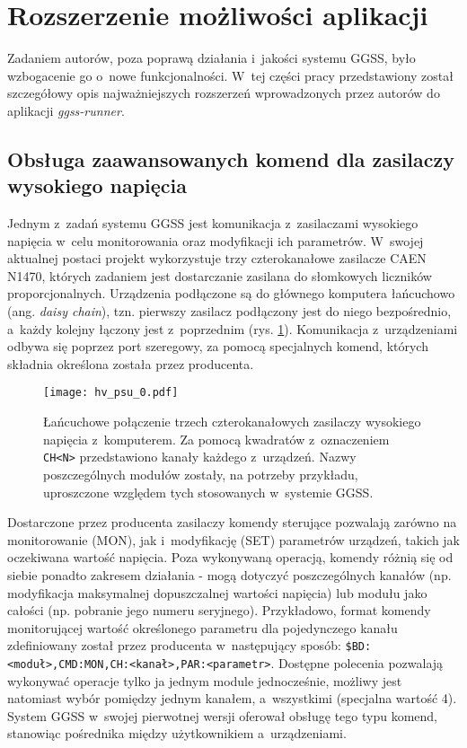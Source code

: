 \clearpage
\section{Rozszerzenie możliwości aplikacji}
Zadaniem autorów, poza poprawą działania i~jakości systemu GGSS, było wzbogacenie go o~nowe funkcjonalności. W~tej części pracy przedstawiony został szczegółowy opis najważniejszych rozszerzeń wprowadzonych przez autorów do aplikacji \emph{ggss-runner}. 

\subsection{Obsługa zaawansowanych komend dla zasilaczy wysokiego napięcia} \label{ch:hv}
Jednym z~zadań systemu GGSS jest komunikacja z~zasilaczami wysokiego napięcia w~celu monitorowania oraz modyfikacji ich parametrów. W~swojej aktualnej postaci projekt wykorzystuje trzy czterokanałowe zasilacze CAEN N1470, których zadaniem jest dostarczanie zasilana do słomkowych liczników proporcjonalnych. Urządzenia podłączone są do głównego komputera łańcuchowo (ang. \emph{daisy chain}), tzn. pierwszy zasilacz podłączony jest do niego bezpośrednio, a~każdy kolejny łączony jest z~poprzednim (rys. \ref{fig:psu0}). Komunikacja z~urządzeniami odbywa się poprzez port szeregowy, za pomocą specjalnych komend, których składnia określona została przez producenta. 

\begin{figure}[H]
\centering
\texttt{[image: hv\_psu\_0.pdf]}
\caption{Łańcuchowe połączenie trzech czterokanałowych zasilaczy wysokiego napięcia z~komputerem. Za pomocą kwadratów z~oznaczeniem \lstinline{CH<N>} przedstawiono kanały każdego z~urządzeń. Nazwy poszczególnych modułów zostały, na potrzeby przykładu, uproszczone względem tych stosowanych w~systemie GGSS.}
\label{fig:psu0}
\end{figure}

Dostarczone przez producenta zasilaczy komendy sterujące pozwalają zarówno na monitorowanie (MON), jak i~modyfikację (SET) parametrów urządzeń, takich jak oczekiwana wartość napięcia. Poza wykonywaną operacją, komendy różnią się od siebie ponadto zakresem działania - mogą dotyczyć poszczególnych kanałów (np. modyfikacja maksymalnej dopuszczalnej wartości napięcia) lub modułu jako całości (np. pobranie jego numeru seryjnego). Przykładowo, format komendy monitorującej wartość określonego parametru dla pojedynczego kanału zdefiniowany został przez producenta w~następujący sposób: \lstinline{$BD:<moduł>,CMD:MON,CH:<kanał>,PAR:<parametr>}. Dostępne polecenia pozwalają wykonywać operacje tylko ja jednym module jednocześnie, możliwy jest natomiast wybór pomiędzy jednym kanałem, a~wszystkimi (specjalna wartość 4). System GGSS w~swojej pierwotnej wersji oferował obsługę tego typu komend, stanowiąc pośrednika między użytkownikiem a~urządzeniami.


